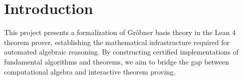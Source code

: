%
%

\chapter{Introduction}
This project presents a formalization of Gröbner basis theory in the Lean 4 theorem prover, establishing the mathematical infrastructure required for automated algebraic reasoning. By constructing certified implementations of fundamental algorithms and theorems, we aim to bridge the gap between computational algebra and interactive theorem proving.


